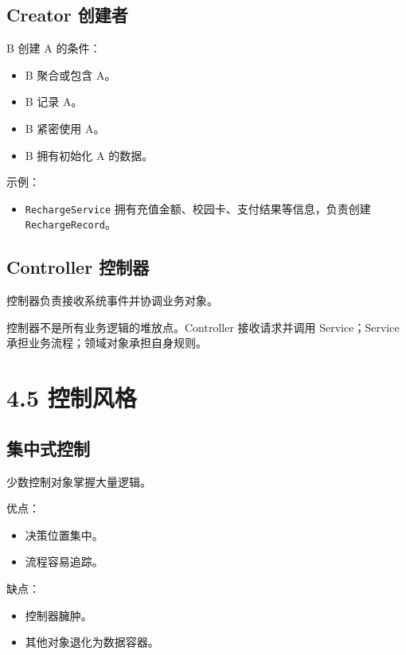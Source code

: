 \documentclass[UTF8,zihao=-4]{ctexart}
\begin{document}
\subsection{Creator 创建者}

B 创建 A 的条件：

\begin{itemize}
\item B 聚合或包含 A。
\item B 记录 A。
\item B 紧密使用 A。
\item B 拥有初始化 A 的数据。
\end{itemize}

示例：

\begin{itemize}
\item \texttt{RechargeService} 拥有充值金额、校园卡、支付结果等信息，负责创建 \texttt{RechargeRecord}。
\end{itemize}

\subsection{Controller 控制器}

控制器负责接收系统事件并协调业务对象。

控制器不是所有业务逻辑的堆放点。Controller 接收请求并调用 Service；Service 承担业务流程；领域对象承担自身规则。

\section{4.5 控制风格}

\subsection{集中式控制}

少数控制对象掌握大量逻辑。

优点：

\begin{itemize}
\item 决策位置集中。
\item 流程容易追踪。
\end{itemize}

缺点：

\begin{itemize}
\item 控制器臃肿。
\item 其他对象退化为数据容器。
\end{itemize}
\end{document}
